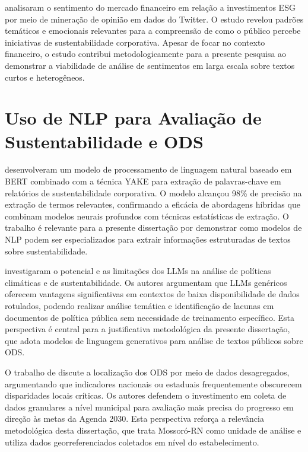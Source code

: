 \citeauthor{jaiswal2024} \citeyear{jaiswal2024} analisaram o sentimento do mercado financeiro em relação a investimentos ESG por meio de mineração de opinião em dados do Twitter. O estudo revelou padrões temáticos e emocionais relevantes para a compreensão de como o público percebe iniciativas de sustentabilidade corporativa. Apesar de focar no contexto financeiro, o estudo contribui metodologicamente para a presente pesquisa ao demonstrar a viabilidade de análise de sentimentos em larga escala sobre textos curtos e heterogêneos.

\section{Uso de NLP para Avaliação de Sustentabilidade e ODS}
\label{sec:tr-ods-nlp}

\citeauthor{gupta2024} \citeyear{gupta2024} desenvolveram um modelo de processamento de linguagem natural baseado em \gls{BERT} combinado com a técnica YAKE para extração de palavras-chave em relatórios de sustentabilidade corporativa. O modelo alcançou 98\% de precisão na extração de termos relevantes, confirmando a eficácia de abordagens híbridas que combinam modelos neurais profundos com técnicas estatísticas de extração. O trabalho é relevante para a presente dissertação por demonstrar como modelos de NLP podem ser especializados para extrair informações estruturadas de textos sobre sustentabilidade.

\citeauthor{larosa2025} \citeyear{larosa2025} investigaram o potencial e as limitações dos LLMs na análise de políticas climáticas e de sustentabilidade. Os autores argumentam que LLMs genéricos oferecem vantagens significativas em contextos de baixa disponibilidade de dados rotulados, podendo realizar análise temática e identificação de lacunas em documentos de política pública sem necessidade de treinamento específico. Esta perspectiva é central para a justificativa metodológica da presente dissertação, que adota modelos de linguagem generativos para análise de textos públicos sobre ODS.

O trabalho de \citeauthor{abidoye2022} \citeyear{abidoye2022} discute a localização dos ODS por meio de dados desagregados, argumentando que indicadores nacionais ou estaduais frequentemente obscurecem disparidades locais críticas. Os autores defendem o investimento em coleta de dados granulares a nível municipal para avaliação mais precisa do progresso em direção às metas da Agenda 2030. Esta perspectiva reforça a relevância metodológica desta dissertação, que trata Mossoró-RN como unidade de análise e utiliza dados georreferenciados coletados em nível do estabelecimento.

